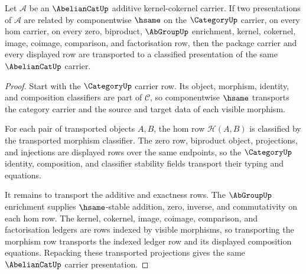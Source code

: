 \begin{theorem}
\label{thm:abeliancat-carrier-classifier-obligation}
Let $\mathcal A$ be an $\AbelianCatUp$ additive kernel-cokernel carrier. If two
presentations of $\mathcal A$ are related by componentwise $\hsame$ on the
$\CategoryUp$ carrier, on every hom carrier, on every zero, biproduct,
$\AbGroupUp$ enrichment, kernel, cokernel, image, coimage, comparison, and
factorisation row, then the package carrier and every displayed row are
transported to a classified presentation of the same $\AbelianCatUp$ carrier.
\end{theorem}
\begin{proof}
Start with the $\CategoryUp$ carrier row. Its object, morphism, identity, and
composition classifiers are part of $\mathcal C$, so componentwise $\hsame$
transports the category carrier and the source and target data of each visible
morphism.

For each pair of transported objects $A,B$, the hom row
$\mathcal H(A,B)$ is classified by the transported morphism classifier. The
zero row, biproduct object, projections, and injections are displayed rows over
the same endpoints, so the $\CategoryUp$ identity, composition, and classifier
stability fields transport their typing and equations.

It remains to transport the additive and exactness rows. The
$\AbGroupUp$ enrichment supplies $\hsame$-stable addition, zero, inverse, and
commutativity on each hom row. The kernel, cokernel, image, coimage, comparison,
and factorisation ledgers are rows indexed by visible morphisms, so transporting
the morphism row transports the indexed ledger row and its displayed
composition equations. Repacking these transported projections gives the same
$\AbelianCatUp$ carrier presentation.
\end{proof}

